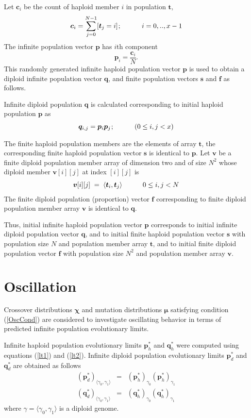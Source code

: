 Let $\bm{c}_i$ be the count of haploid member $i$ in population $\bm{t}$,
\[
\bm{c}_i = \sum \limits_{j=0}^{N-1} [\bm{t}_j = i]  \hspace{0.01in}; \hspace{30pt}  {i = 0,.., x-1}
\]
The infinite population vector $\bm{p}$ has $i$th component
\[
\bm{p}_i = \frac{\bm{c}_i}{ N }.
\]
This randomly generated infinite haploid population vector $\bm{p}$ is used to obtain a diploid infinite population vector $\bm{q}$,  
and finite population vectors $\bm{s}$ and $\bm{f}$ as follows.

Infinite diploid population $\bm{q}$ is calculated corresponding to initial haploid population $\bm{p}$ as
\[
\bm{q}_{i,j} = \bm{p}_i \bm{p}_j  \hspace{0.01in}; \hspace{30pt}  (0 \leq i,j < x)
\]

The finite haploid population members are the elements of array $\bm{t}$, 
the corresponding finite haploid population vector $\bm{s}$ is identical to $\bm{p}$. 
Let $\bm{v}$ be a finite diploid population member array of dimension two and of size $N^2$ whose diploid member 
$\bm{v}[i][j]$ at index $[i][j]$ is
\[
\bm{v}[i][j] \;=\; \langle \bm{t}_i, \bm{t}_j \rangle \hspace{30pt} 0 \leq i,j < N
\]
The finite diploid population (proportion) vector $\bm{f}$ corresponding to 
finite diploid population member array $\bm{v}$ is identical to $\bm{q}$.

Thus, initial infinite haploid population vector $\bm{p}$ corresponds to initial infinite diploid 
population vector $\bm{q}$, and to initial finite 
haploid population vector $\bm{s}$ with population size $N$ and population member array $\bm{t}$, 
and to initial finite diploid population vector $\bm{f}$ with population size $N^2$ and population member array $\bm{v}$.

\section{Oscillation}
\label{Oscillation}
Crossover distributions $\bm{\chi}$ and mutation distributions $\bm{\mu}$ satisfying 
condition (\ref{OscCond}) are considered to investigate oscillating behavior in terms of  
predicted infinite population evolutionary limits.

Infinite haploid population evolutionary limits $\bm{p}_h^{\ast}$ and $\bm{q}_h^{\ast}$ 
were computed using equations (\ref{lt1}) and (\ref{lt2}). 
Infinite diploid population evolutionary limits $\bm{p}_d^{\ast}$ and $\bm{q}_d^{\ast}$ are obtained as follows
\begin{eqnarray*}
({\bm{p}_d^{\ast}})_{\langle \gamma_0, \gamma_1 \rangle} & = & ({\bm{p}_h^{\ast}})_{\gamma_0} ({\bm{p}_h^{\ast}})_{\gamma_1} \\
({\bm{q}_d^{\ast}})_{\langle \gamma_0, \gamma_1 \rangle} & = & ({\bm{q}_h^{\ast}})_{\gamma_0} ({\bm{q}_h^{\ast}})_{\gamma_1}
\end{eqnarray*}
where $\gamma = \langle \gamma_0, \gamma_1 \rangle$ is a diploid genome.

